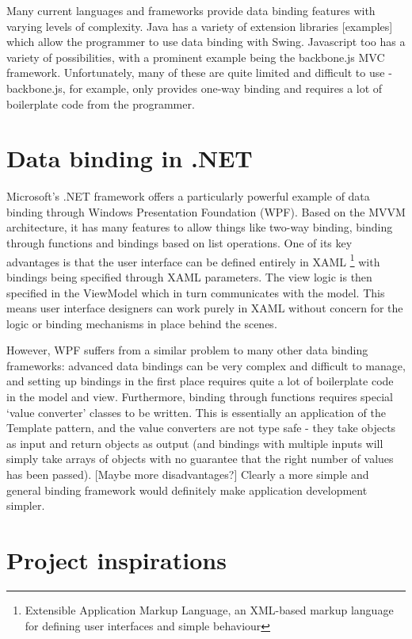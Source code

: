 \documentclass[12pt,twoside,notitlepage]{report}
\begin{document}
Many current languages and frameworks provide data binding features with varying levels of complexity. Java has a variety of extension libraries [examples] which allow the programmer to use data binding with Swing. Javascript too has a variety of possibilities, with a prominent example being the backbone.js MVC framework. Unfortunately, many of these are quite limited and difficult to use - backbone.js, for example, only provides one-way binding and requires a lot of boilerplate code from the programmer.

\section{Data binding in .NET}

Microsoft’s .NET framework offers a particularly powerful example of data binding through Windows Presentation Foundation (WPF). Based on the MVVM architecture, it has many features to allow things like two-way binding, binding through functions and bindings based on list operations. One of its key advantages is that the user interface can be defined entirely in XAML \footnote{Extensible Application Markup Language, an XML-based markup language for defining user interfaces and simple behaviour} with bindings being specified through XAML parameters. The view logic is then specified in the ViewModel which in turn communicates with the model. This means user interface designers can work purely in XAML without concern for the logic or binding mechanisms in place behind the scenes.

However, WPF suffers from a similar problem to many other data binding frameworks: advanced data bindings can be very complex and difficult to manage, and setting up bindings in the first place requires quite a lot of boilerplate code in the model and view. Furthermore, binding through functions requires special ‘value converter’ classes to be written. This is essentially an application of the Template pattern, and the value converters are not type safe - they take objects as input and return objects as output (and bindings with multiple inputs will simply take arrays of objects with no guarantee that the right number of values has been passed). [Maybe more disadvantages?] Clearly a more simple and general binding framework would definitely make application development simpler.

\section{Project inspirations}
\end{document}
